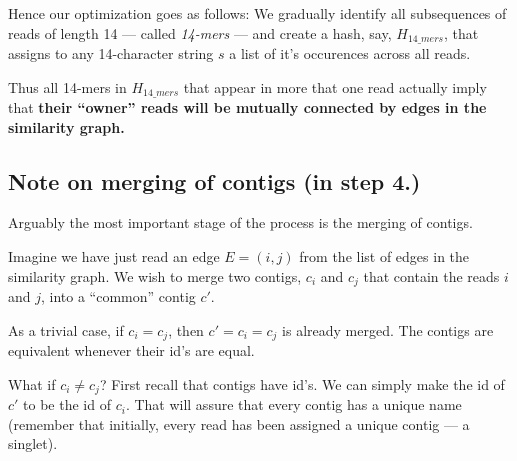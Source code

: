 \documentclass[11pt, oneside]{article}
\begin{document}
Hence our optimization goes as follows:
We gradually identify all subsequences of reads of length 14 --- called \emph{14-mers} --- and
create a hash, say, $H_{14\_mers}$, that assigns to any 14-character string $s$ a list of
it's occurences across all reads.

Thus all 14-mers in $H_{14\_mers}$ that appear in more that one read actually imply that
{\bf their ``owner'' reads will be mutually connected by edges in the similarity graph.} 

\subsection{Note on merging of contigs (in step 4.)}

Arguably the most important stage of the process is the merging of contigs.

Imagine we have just read an edge $E = (i,j)$ from the list of edges in the similarity graph.  
We wish to merge two contigs, $c_i$ and $c_j$ that contain the reads $i$ and $j$, into
a ``common'' contig $c'$.

As a trivial case, if $c_i = c_j$, then $c' = c_i = c_j$ is already merged.
The contigs are equivalent whenever their id's are equal.

What if $c_i \neq c_j$? 
First recall that contigs have id's. We can simply make the id of $c'$ to be the id of $c_i$.
That will assure that every contig has a unique name
(remember that initially, every read has been assigned a unique contig --- a singlet).
\end{document}
